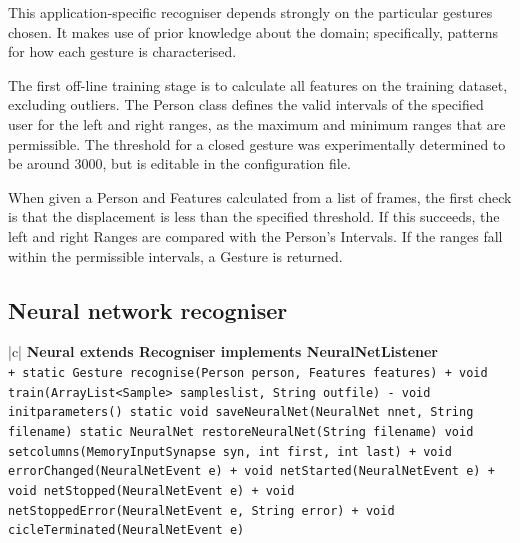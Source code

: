 \documentclass[12pt,a4,notitlepage]{report}
\renewcommand{\_}{\texttt{\symbol{95}}}
\newcommand{\<}{\texttt{\symbol{60}}}
\renewcommand{\>}{\texttt{\symbol{62}}}
\newcommand{\class}[1]{\textbf{#1}}
\newcommand{\variable}[1]{\texttt{#1}}
\begin{document}
This application-specific recogniser depends strongly on the particular gestures chosen. It makes use of prior knowledge about the domain; specifically, patterns for how each gesture is characterised.

The first off-line training stage is to calculate all features on the training dataset, excluding outliers. The Person class defines the valid intervals of the specified user for the left and right ranges, as the maximum and minimum ranges that are permissible. The threshold for a closed gesture was experimentally determined to be around 3000, but is editable in the configuration file.

When given a Person and Features calculated from a list of frames, the first check is that the displacement is less than the specified threshold. If this succeeds, the left and right Ranges are compared with the Person's Intervals. If the ranges fall within the permissible intervals, a Gesture is returned.

\newpage

\subsection{Neural network recogniser}

\begin{tabular}{|c|} \hline 
\class{Neural extends Recogniser implements NeuralNetListener} \\ \hline
{}
{ \variable{+ static Gesture recognise(Person person, Features features) \newline
+ void train(ArrayList<Sample> sampleslist, String out\_file) \newline
- void init\_parameters() \newline
static void saveNeuralNet(NeuralNet nnet, String filename) \newline
static NeuralNet restoreNeuralNet(String filename) \newline
void set\_columns(MemoryInputSynapse syn, int first, int last) \newline
+ void errorChanged(NeuralNetEvent e) \newline
+ void netStarted(NeuralNetEvent e) \newline
+ void netStopped(NeuralNetEvent e) \newline
+ void netStoppedError(NeuralNetEvent e, String error) \newline
+ void cicleTerminated(NeuralNetEvent e)
} } \\ \hline
\end{tabular}
\end{document}

